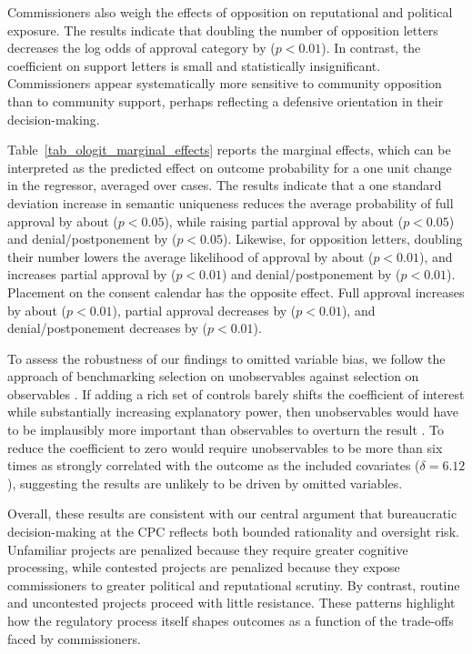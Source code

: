 Commissioners also weigh the effects of opposition on reputational and political exposure. The results indicate that doubling the number of opposition letters decreases the log odds of approval category by  ($p<0.01$). In contrast, the coefficient on support letters is small and statistically insignificant. Commissioners appear systematically more sensitive to community opposition than to community support, perhaps reflecting a defensive orientation in their decision-making.

Table~\ref{tab_ologit_marginal_effects} reports the marginal effects, which can be interpreted as the predicted effect on outcome probability for a one unit change in the regressor, averaged over cases. 
The results indicate that a one standard deviation increase in semantic uniqueness reduces the average probability of full approval by about  ($p<0.05$), while raising partial approval by about  ($p<0.05$) and denial/postponement by  ($p<0.05$). Likewise, for opposition letters, doubling their number lowers the average likelihood of approval by about  ($p<0.01$), and increases partial approval by  ($p<0.01$) and denial/postponement by  ($p<0.01$). Placement on the consent calendar has the opposite effect. Full approval increases by about  ($p<0.01$), partial approval decreases by  ($p<0.01$), and denial/postponement decreases by  ($p<0.01$).

To assess the robustness of our findings to omitted variable bias, we follow the approach of benchmarking selection on unobservables against selection on observables \citep{AltonjiElderTaber2005}. If adding a rich set of controls barely shifts the coefficient of interest while substantially increasing explanatory power, then unobservables would have to be implausibly more important than observables to overturn the result \citep{Oster2019}. To reduce the coefficient to zero would require unobservables to be more than six times as strongly correlated with the outcome as the included covariates ($\delta = 6.12$), suggesting the results are unlikely to be driven by omitted variables.


Overall, these results are consistent with our central argument that bureaucratic decision-making at the CPC reflects both bounded rationality and oversight risk. Unfamiliar projects are penalized because they require greater cognitive processing, while contested projects are penalized because they expose commissioners to greater political and reputational scrutiny. By contrast, routine and uncontested projects proceed with little resistance. These patterns highlight how the regulatory process itself shapes outcomes as a function of the trade-offs faced by commissioners.
